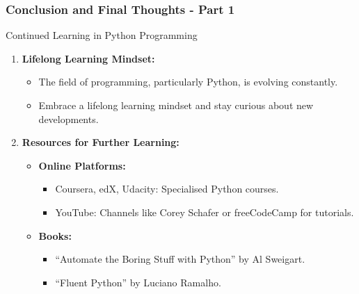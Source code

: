 \documentclass{beamer}
\begin{document}
\begin{frame}[fragile]
    \frametitle{Conclusion and Final Thoughts - Part 1}
    
    \begin{block}{Continued Learning in Python Programming}
        \begin{enumerate}
            \item \textbf{Lifelong Learning Mindset:}
            \begin{itemize}
                \item The field of programming, particularly Python, is evolving constantly. 
                \item Embrace a lifelong learning mindset and stay curious about new developments.
            \end{itemize}
            
            \item \textbf{Resources for Further Learning:}
            \begin{itemize}
                \item \textbf{Online Platforms:}
                \begin{itemize}
                    \item Coursera, edX, Udacity: Specialised Python courses.
                    \item YouTube: Channels like Corey Schafer or freeCodeCamp for tutorials.
                \end{itemize}
                \item \textbf{Books:}
                \begin{itemize}
                    \item “Automate the Boring Stuff with Python” by Al Sweigart.
                    \item “Fluent Python” by Luciano Ramalho.
                \end{itemize}
            \end{itemize}
        \end{enumerate}
    \end{block}
\end{frame}
\end{document}
